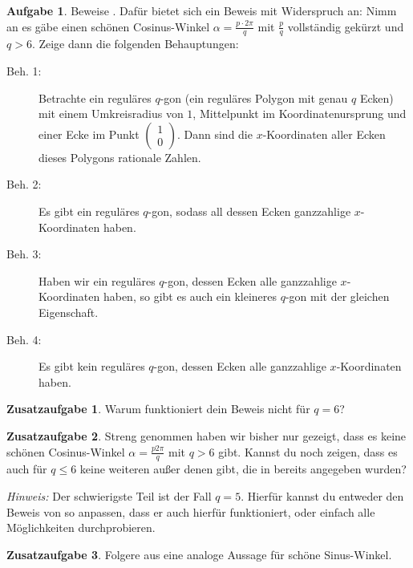 \documentclass[a4paper,ngerman,12pt]{scrartcl}
\theoremstyle{definition}
\newtheorem{aufg}{Aufgabe}
\newtheorem{zaufg}{Zusatzaufgabe}
\theoremstyle{plain}
\theoremstyle{remark}
\begin{document}
\begin{aufg}
	Beweise . Dafür bietet sich ein Beweis mit Widerspruch an: Nimm an es gäbe einen schönen Cosinus-Winkel $\alpha=\tfrac{p\cdot 2\pi}{q}$ mit $\frac{p}{q}$ vollständig gekürzt und $q > 6$. Zeige dann die folgenden Behauptungen:
	\begin{description}
		\item[Beh. 1:] Betrachte ein reguläres $q$-gon (ein reguläres Polygon mit genau $q$ Ecken) mit einem Umkreisradius von $1$, Mittelpunkt im Koordinatenursprung und einer Ecke im Punkt $\begin{pmatrix}1\\0\end{pmatrix}$. Dann sind die $x$-Koordinaten aller Ecken dieses Polygons rationale Zahlen.
		\item[Beh. 2:] Es gibt ein reguläres $q$-gon, sodass all dessen Ecken ganzzahlige $x$-Koordinaten haben.
		\item[Beh. 3:] Haben wir ein reguläres $q$-gon, dessen Ecken alle ganzzahlige $x$-Koordinaten haben, so gibt es auch ein kleineres $q$-gon mit der gleichen Eigenschaft.
		\item[Beh. 4:] Es gibt kein reguläres $q$-gon, dessen Ecken alle ganzzahlige $x$-Koordinaten haben.
	\end{description}
\end{aufg}

\begin{zaufg}
	Warum funktioniert dein Beweis nicht für $q=6$?
\end{zaufg}

\begin{zaufg}
	Streng genommen haben wir bisher nur gezeigt, dass es keine schönen Cosinus-Winkel $\alpha=\tfrac{p2\pi}{q}$ mit $q > 6$ gibt. Kannst du noch zeigen, dass es auch für $q \leq 6$ keine weiteren außer denen gibt, die in  bereits angegeben wurden?
	
	\textit{Hinweis:} Der schwierigste Teil ist der Fall $q=5$. Hierfür kannst du entweder den Beweis von  so anpassen, dass er auch hierfür funktioniert, oder einfach alle Möglichkeiten durchprobieren.
\end{zaufg}

\begin{zaufg}
	Folgere aus  eine analoge Aussage für schöne Sinus-Winkel.
\end{zaufg}
\end{document}
